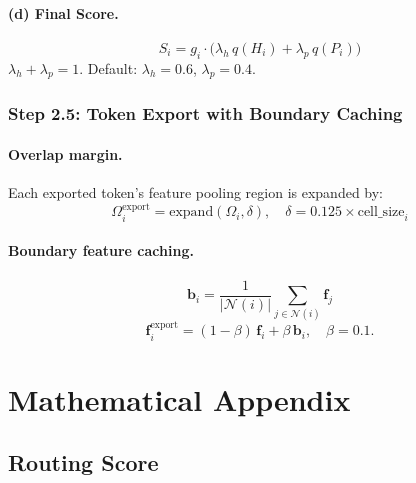 \documentclass[11pt,a4paper]{article}
\begin{document}
\paragraph{(d) Final Score.}
\begin{equation}
\boxed{S_i = g_i \cdot \Big(\lambda_h \, q(H_i) + \lambda_p \, q(P_i)\Big)}
\label{eq:score}
\end{equation}
$\lambda_h + \lambda_p = 1$. Default: $\lambda_h = 0.6$, $\lambda_p = 0.4$.

\subsubsection{Step 2.5: Token Export with Boundary Caching}

\paragraph{Overlap margin.}
Each exported token's feature pooling region is expanded by:
\begin{equation}
\Omega_i^{\mathrm{export}} = \mathrm{expand}(\Omega_i, \delta), \quad \delta = 0.125 \times \mathrm{cell\_size}_i
\end{equation}

\paragraph{Boundary feature caching.}
\begin{equation}
\mathbf{b}_i = \frac{1}{|\mathcal{N}(i)|} \sum_{j \in \mathcal{N}(i)} \mathbf{f}_j
\label{eq:boundary_cache}
\end{equation}
\begin{equation}
\mathbf{f}_i^{\mathrm{export}} = (1 - \beta)\,\mathbf{f}_i + \beta\,\mathbf{b}_i, \quad \beta = 0.1.
\label{eq:boundary_blend}
\end{equation}


\section{Mathematical Appendix}

\subsection{Routing Score}
\end{document}
